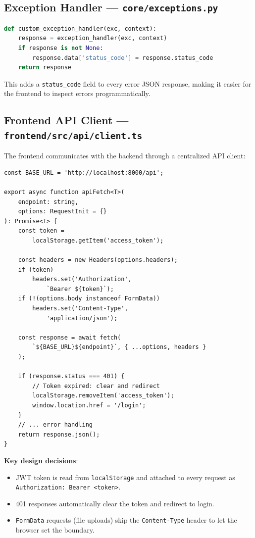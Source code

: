 \documentclass[12pt, a4paper]{article}
\begin{document}
\subsection{Exception Handler --- \texttt{core/exceptions.py}}

\begin{lstlisting}[language=Python, caption={Custom Exception Handler}]
def custom_exception_handler(exc, context):
    response = exception_handler(exc, context)
    if response is not None:
        response.data['status_code'] = response.status_code
    return response
\end{lstlisting}

This adds a \texttt{status\_code} field to every error JSON response, making it easier for the frontend to inspect errors programmatically.

\subsection{Frontend API Client --- \texttt{frontend/src/api/client.ts}}

The frontend communicates with the backend through a centralized API client:

\begin{lstlisting}[caption={Frontend API Client (TypeScript)}]
const BASE_URL = 'http://localhost:8000/api';

export async function apiFetch<T>(
    endpoint: string,
    options: RequestInit = {}
): Promise<T> {
    const token =
        localStorage.getItem('access_token');

    const headers = new Headers(options.headers);
    if (token)
        headers.set('Authorization',
            `Bearer ${token}`);
    if (!(options.body instanceof FormData))
        headers.set('Content-Type',
            'application/json');

    const response = await fetch(
        `${BASE_URL}${endpoint}`, { ...options, headers }
    );

    if (response.status === 401) {
        // Token expired: clear and redirect
        localStorage.removeItem('access_token');
        window.location.href = '/login';
    }
    // ... error handling
    return response.json();
}
\end{lstlisting}

\textbf{Key design decisions}:
\begin{itemize}
    \item JWT token is read from \texttt{localStorage} and attached to every request as \texttt{Authorization: Bearer <token>}.
    \item 401 responses automatically clear the token and redirect to login.
    \item \texttt{FormData} requests (file uploads) skip the \texttt{Content-Type} header to let the browser set the boundary.
\end{itemize}
\end{document}
